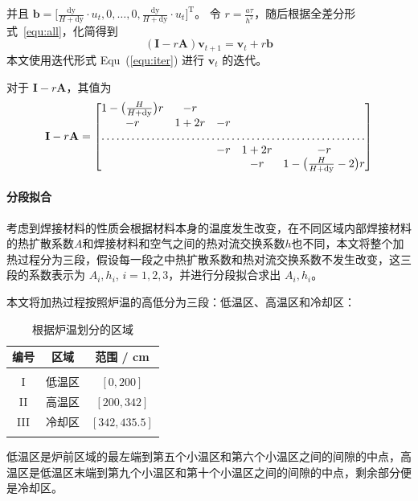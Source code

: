 \documentclass[../main.tex]{subfiles}
\begin{document}
并且 \(\mathbf{b} = \displaystyle \bigg[ \frac{\mathrm{dy}}{H + \mathrm{dy}} \cdot u_{t} , 0 ,\dots, 0 , \frac{\mathrm{dy}}{H + \mathrm{dy}} \cdot u_{t} \bigg] ^{\mathrm{T}}\)。
令 \(r = \displaystyle \frac{a \tau}{h ^{2}}\)，随后根据全差分形式~\ref{equ:all}，化简得到
\begin{equation}\label{equ:iter}
(\mathbf{I} - r\mathbf{A} ) \mathbf{v} _{t+1} = \mathbf{v}_{t} + r \mathbf{b}
\end{equation}
本文使用迭代形式 Equ~(\ref{equ:iter}) 进行 \(\mathbf{v}_{t}\) 的迭代。

对于 \(\mathbf{I} - r \mathbf{A}\)，其值为
\begin{equation}
\mathbf{I} - r \mathbf{A} =
\begin{bmatrix}
1 - \big(\frac{H}{H + \mathrm{dy}}\big) r & -r \\
-r & 1 + 2r & -r \\
\hdotsfor{5}\\
&&-r & 1 + 2r & -r \\
&&& -r & 1 - \big(\frac{H}{H + \mathrm{dy}}- 2\big)r
\end{bmatrix}
\end{equation}

\paragraph{分段拟合} 考虑到焊接材料的性质会根据材料本身的温度发生改变，在不同区域内部焊接材料的热扩散系数\(A\)和焊接材料和空气之间的热对流交换系数\(h\)也不同，本文将整个加热过程分为三段，假设每一段之中热扩散系数和热对流交换系数不发生改变，这三段的系数表示为 \(A_{i}, h_{i}\), \(i = 1 , 2 ,3 \)，并进行分段拟合求出 \(A_{i} ,h_{i}\)。

本文将加热过程按照炉温的高低分为三段：低温区、高温区和冷却区：
\begin{table}[H]
\centering
\begin{tabular}{ccc}
编号&区域 & 范围 / cm \\ \hline \hline
\\ [-1em]
I&低温区& \([0 , 200]\) \\
II&高温区& \([200, 342]\) \\
III&冷却区& \([342, 435.5]\)
\\ [-1em]
\\ \hline
\end{tabular}\caption{根据炉温划分的区域}
\end{table}
低温区是炉前区域的最左端到第五个小温区和第六个小温区之间的间隙的中点，高温区是低温区末端到第九个小温区和第十个小温区之间的间隙的中点，剩余部分便是冷却区。
\end{document}

